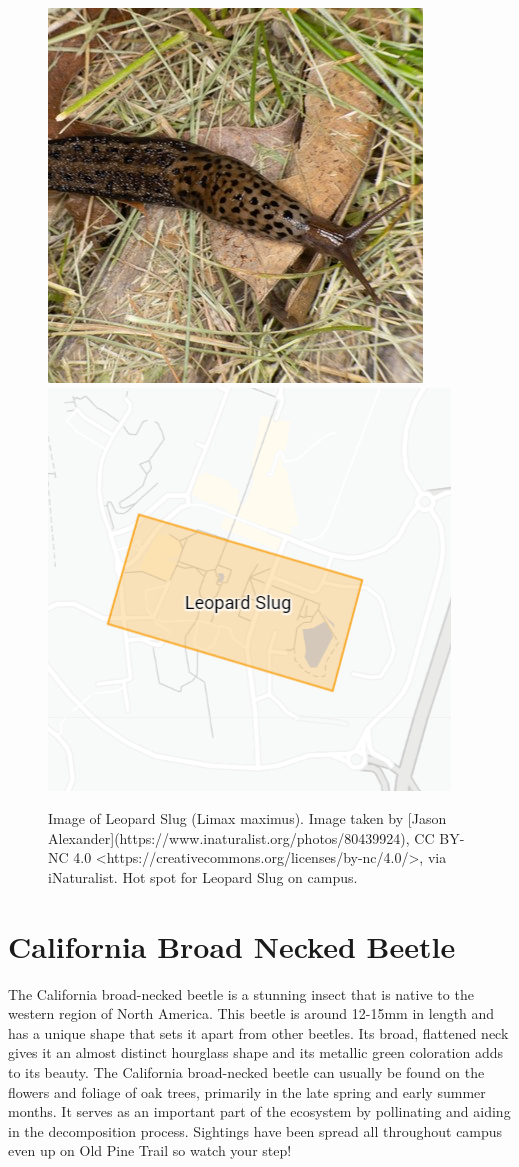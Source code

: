 \documentclass[
]{book}
\begin{document}
\begin{figure}

{\centering \includegraphics[width=0.49\linewidth,height=0.2\textheight]{insect_images/slug_11} \includegraphics[width=0.49\linewidth,height=0.2\textheight]{insect_images/slug_hotspot_11} 

}

\caption{Image of Leopard Slug (Limax maximus). Image taken by [Jason Alexander](https://www.inaturalist.org/photos/80439924), CC BY-NC 4.0 <https://creativecommons.org/licenses/by-nc/4.0/>, via iNaturalist. Hot spot for Leopard Slug on campus.}\label{fig:unnamed-chunk-4}
\end{figure}

\hypertarget{california-broad-necked-beetle}{%
\section{California Broad Necked Beetle}\label{california-broad-necked-beetle}}

The California broad-necked beetle is a stunning insect that is native to the western region of North America. This beetle is around 12-15mm in length and has a unique shape that sets it apart from other beetles. Its broad, flattened neck gives it an almost distinct hourglass shape and its metallic green coloration adds to its beauty. The California broad-necked beetle can usually be found on the flowers and foliage of oak trees, primarily in the late spring and early summer months. It serves as an important part of the ecosystem by pollinating and aiding in the decomposition process. Sightings have been spread all throughout campus even up on Old Pine Trail so watch your step!
\end{document}
